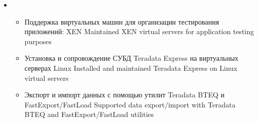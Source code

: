 \documentclass[11pt,a4paper,sans, russian]{moderncv}        %
\begin{document}
{\begin{itemize}
\begin{itemize}
		\end{itemize}
	\item {}
		\begin{itemize}
			\item {}
				{Поддержка виртуальных машин для организации тестирования приложений: XEN}
				{Maintained XEN virtual servers for application testing purposes}
			\item {}
				{Установка и сопровождение СУБД Teradata Express на виртуальных серверах Linux}
				{Installed and maintained Teradata Express on Linux virtual servers}
			\item {}
				{Экспорт и импорт данных с помощью утилит Teradata BTEQ и FastExport/FastLoad}
				{Supported data export/import with Teradata BTEQ and FastExport/FastLoad utilities}
		\end{itemize}
	\end{itemize}
}
\end{document}
